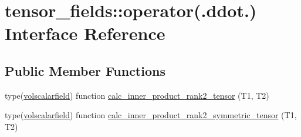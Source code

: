 \hypertarget{interfacetensor__fields_1_1operator_07_8ddot_8_08}{\section{tensor\-\_\-fields\-:\-:operator(.ddot.) Interface Reference}
\label{interfacetensor__fields_1_1operator_07_8ddot_8_08}
}
\subsection*{Public Member Functions}
\begin{DoxyCompactItemize}
\item 
type(\hyperlink{structtensor__fields_1_1volscalarfield}{volscalarfield}) function \hyperlink{interfacetensor__fields_1_1operator_07_8ddot_8_08_a8ef27eb35a2622840d3d64817e1f0060}{calc\-\_\-inner\-\_\-product\-\_\-rank2\-\_\-tensor} (T1, T2)
\item 
type(\hyperlink{structtensor__fields_1_1volscalarfield}{volscalarfield}) function \hyperlink{interfacetensor__fields_1_1operator_07_8ddot_8_08_aeb8633c84fe419ab2f6f2cdcfc985f0f}{calc\-\_\-inner\-\_\-product\-\_\-rank2\-\_\-symmetric\-\_\-tensor} (T1, T2)
\end{DoxyCompactItemize}



